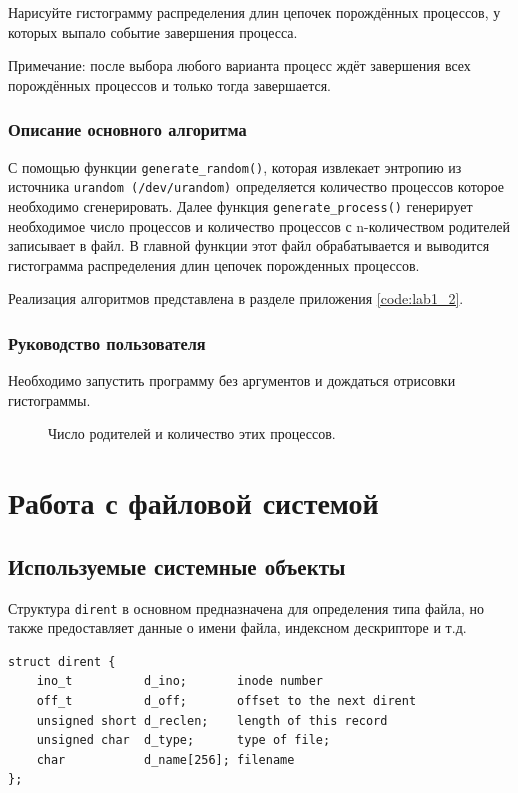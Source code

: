 \documentclass[a4paper,14pt]{extarticle}
\begin{document}
Нарисуйте гистограмму распределения длин цепочек порождённых процессов, у которых выпало событие завершения процесса. 

Примечание: после выбора любого варианта процесс ждёт завершения всех порождённых процессов и только тогда завершается. 

\subsubsection{Описание основного алгоритма}
С помощью функции \verb|generate_random()|, которая извлекает энтропию из источника \verb|urandom (/dev/urandom)| определяется количество процессов которое необходимо сгенерировать. Далее функция \verb|generate_process()| генерирует необходимое число процессов и количество процессов с n-количеством родителей записывает в файл. В главной функции этот файл обрабатывается и выводится гистограмма распределения длин  цепочек порожденных процессов.

Реализация алгоритмов представлена в разделе приложения \ref{code:lab1_2}.

\subsubsection{Руководство пользователя}
Необходимо запустить программу без аргументов и дождаться отрисовки гистограммы.

\begin{figure}[h]
\caption{Число родителей и количество этих процессов.}
\label{1.png}
\end{figure}
\newpage

\section{Работа с файловой системой}
\subsection{Используемые системные объекты}
Структура \verb|dirent| в основном предназначена для определения типа файла, но также предоставляет данные о имени файла, индексном дескрипторе и т.д.
\begin{verbatim}
struct dirent {
    ino_t          d_ino;       inode number
    off_t          d_off;       offset to the next dirent
    unsigned short d_reclen;    length of this record
    unsigned char  d_type;      type of file;
    char           d_name[256]; filename
};
\end{verbatim}
\end{document}
